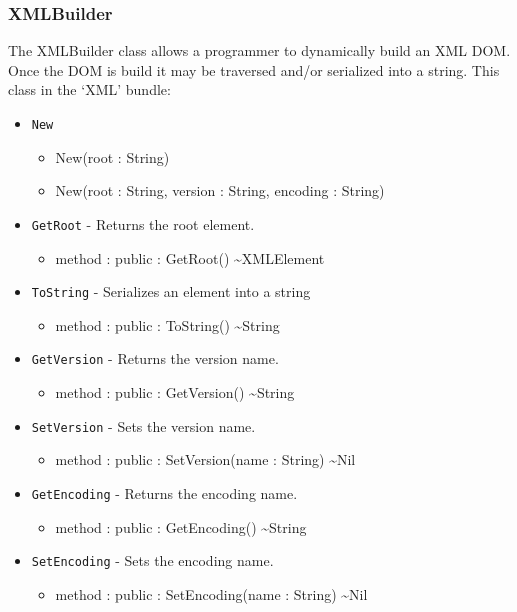 \documentclass[12pt]{article}
\begin{document}
\subsubsection{XMLBuilder}
The XMLBuilder class allows a programmer to dynamically build an XML
DOM.  Once the DOM is build it may be traversed and/or serialized into
a string. This class in the `XML' bundle:
\begin{itemize}
\item \texttt{New}
  \begin{itemize}
  \item New(root : String)
  \item New(root : String, version : String, encoding : String)
  \end{itemize}
\item \texttt{GetRoot} - Returns the root element.
  \begin{itemize}
  \item method : public : GetRoot() \textasciitilde XMLElement
  \end{itemize}
\item \texttt{ToString} - Serializes an element into a string
  \begin{itemize}
  \item method : public : ToString() \textasciitilde String
  \end{itemize}
\item \texttt{GetVersion} - Returns the version name.
  \begin{itemize}
  \item method : public : GetVersion() \textasciitilde String
  \end{itemize}
\item \texttt{SetVersion} - Sets the version name.
  \begin{itemize}
  \item method : public : SetVersion(name : String) \textasciitilde Nil
  \end{itemize}
\item \texttt{GetEncoding} - Returns the encoding name.
  \begin{itemize}
  \item method : public : GetEncoding() \textasciitilde String
  \end{itemize}
\item \texttt{SetEncoding} - Sets the encoding name.
  \begin{itemize}
  \item method : public : SetEncoding(name : String) \textasciitilde Nil
  \end{itemize}
\end{itemize}
\end{document}
